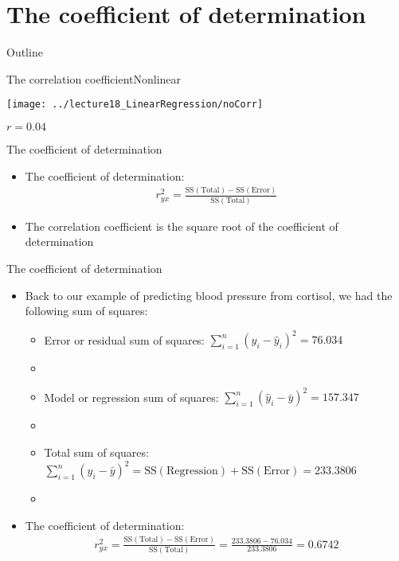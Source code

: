 \documentclass[xcolor=dvipsnames]{beamer}
\begin{document}
\section{The coefficient of determination}
\begin{frame}{Outline}
	\tableofcontents[currentsection,subsectionstyle=show/shaded/hide]
\end{frame}

\begin{frame}{The correlation coefficient}{Nonlinear}
	\begin{center}
		\texttt{[image: ../lecture18\_LinearRegression/noCorr]}
		
		$r = 0.04$
	\end{center}
\end{frame}

\begin{frame}{The coefficient of determination}
	\begin{itemize}
		\item The coefficient of determination:
		\begin{gather*}
		r^2_{yx} = \frac{\text{SS}(\text{Total})-\text{SS}(\text{Error})}{\text{SS}(\text{Total})}
		\end{gather*}
		\item The correlation coefficient is the square root of the coefficient of determination
	\end{itemize}
\end{frame}

\begin{frame}{The coefficient of determination}
	\begin{itemize}
		\item Back to our example of predicting blood pressure from cortisol, we had the following sum of squares:
		\begin{itemize}
			\item Error or residual sum of squares: $\sum_{i=1}^n (y_i - \hat{y}_i)^2=76.034$
			\item[]
			\item Model or regression sum of squares: $\sum_{i=1}^n (\hat{y}_i-\bar{y})^2=157.347$
			\item[]
			\item Total sum of squares: $\sum_{i=1}^n (y_i -\bar{y})^2 = \text{SS}(\text{Regression})+\text{SS}(\text{Error}) = 233.3806$
			\item[]
		\end{itemize}
		\item The coefficient of determination:
		\begin{gather*}
		r^2_{yx} = \frac{\text{SS}(\text{Total})-\text{SS}(\text{Error})}{\text{SS}(\text{Total})} = \frac{233.3806 - 76.034}{233.3806} = 0.6742
		\end{gather*}
	\end{itemize}
\end{frame}
\end{document}
